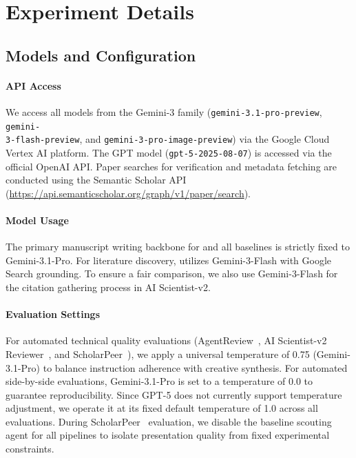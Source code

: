 \section{Experiment Details}
\label{appendix:exp_details}

\subsection{Models and Configuration}
\label{appendix:model_details}

\paragraph{API Access} We access all models from the Gemini-3 family (\texttt{gemini-3.1-pro-preview}, \texttt{gemini-\\3-flash-preview}, and \texttt{gemini-3-pro-image-preview}) via the Google Cloud Vertex AI platform. The GPT model (\texttt{gpt-5-2025-08-07}) is accessed via the official OpenAI API. Paper searches for verification and metadata fetching are conducted using the Semantic Scholar API (\url{https://api.semanticscholar.org/graph/v1/paper/search}).

\paragraph{Model Usage} The primary manuscript writing backbone for \ourmethod{} and all baselines is strictly fixed to Gemini-3.1-Pro. For literature discovery, \ourmethod{} utilizes Gemini-3-Flash with Google Search grounding. To ensure a fair comparison, we also use Gemini-3-Flash for the citation gathering process in AI Scientist-v2.

\paragraph{Evaluation Settings} For automated technical quality evaluations (AgentReview~\citep{jin2024agentreview}, AI Scientist-v2 Reviewer~\citep{yamada2025aiscientistv2}, and ScholarPeer~\citep{goyal2026scholarpeer}), we apply a universal temperature of 0.75 (Gemini-3.1-Pro) to balance instruction adherence with creative synthesis. For automated side-by-side evaluations, Gemini-3.1-Pro is set to a temperature of 0.0 to guarantee reproducibility. Since GPT-5 does not currently support temperature adjustment, we operate it at its fixed default temperature of 1.0 across all evaluations. During ScholarPeer~\citep{goyal2026scholarpeer} evaluation, we disable the baseline scouting agent for all pipelines to isolate presentation quality from fixed experimental constraints.

